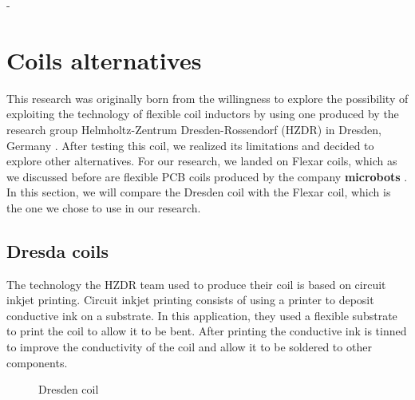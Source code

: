 -\section{Coils alternatives}
This research was originally born from the willingness to explore the possibility of exploiting the technology of flexible coil inductors by using one produced by the research group Helmholtz-Zentrum Dresden-Rossendorf (HZDR) in Dresden, Germany \cite{HZDR}.
After testing this coil, we realized its limitations and decided to explore other alternatives.
For our research, we landed on Flexar coils, which as we discussed before are flexible PCB coils produced by the company \textbf{microbots} \cite{microbots}.
In this section, we will compare the Dresden coil with the Flexar coil, which is the one we chose to use in our research.

\subsection{Dresda coils}
The technology the HZDR team used to produce their coil is based on circuit inkjet printing.
Circuit inkjet printing consists of using a printer to deposit conductive ink on a substrate.
In this application, they used a flexible substrate to print the coil to allow it to be bent.
After printing the conductive ink is tinned to improve the conductivity of the coil and allow it to be soldered to other components.
\begin{figure}
    \centering
    \caption{Dresden coil \cite{HZDR}}
    \label{fig:Dresden_coil}
\end{figure}

